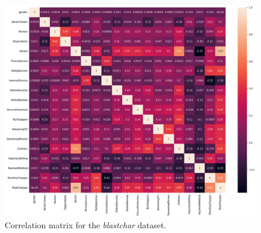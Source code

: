 \documentclass{article}
\begin{document}
\begin{figure}[hpt]
  \begin{center}
      \includegraphics[width=12.5cm]{blastchar-correlation.png}
  \end{center}
  \caption{Correlation matrix for the \textit{blastchar} dataset.}
  \label{fig:correlation-blastchar}
\end{figure}
\end{document}
